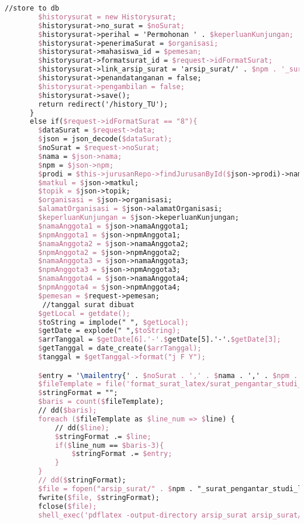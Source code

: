 \begin{lstlisting}[language=tex,basicstyle=\tiny,caption=HistorysuratController.php]
        //store to db
        $historysurat = new Historysurat;
        $historysurat->no_surat = $noSurat;
        $historysurat->perihal = 'Permohonan ' . $keperluanKunjungan;
        $historysurat->penerimaSurat = $organisasi;
        $historysurat->mahasiswa_id = $pemesan;
        $historysurat->formatsurat_id = $request->idFormatSurat;
        $historysurat->link_arsip_surat = 'arsip_surat/' . $npm . '_surat_pengantar_studi_lapangan_4orang.pdf';
        $historysurat->penandatanganan = false;
        $historysurat->pengambilan = false;
        $historysurat->save();
        return redirect('/history_TU');
      }
      else if($request->idFormatSurat == "8"){
        $dataSurat = $request->data;
        $json = json_decode($dataSurat);
        $noSurat = $request->noSurat;
        $nama = $json->nama;
        $npm = $json->npm;
        $prodi = $this->jurusanRepo->findJurusanById($json->prodi)->nama_jurusan;
        $matkul = $json->matkul;
        $topik = $json->topik;
        $organisasi = $json->organisasi;
        $alamatOrganisasi = $json->alamatOrganisasi;
        $keperluanKunjungan = $json->keperluanKunjungan;
        $namaAnggota1 = $json->namaAnggota1;
        $npmAnggota1 = $json->npmAnggota1;
        $namaAnggota2 = $json->namaAnggota2;
        $npmAnggota2 = $json->npmAnggota2;
        $namaAnggota3 = $json->namaAnggota3;
        $npmAnggota3 = $json->npmAnggota3;
        $namaAnggota4 = $json->namaAnggota4;
        $npmAnggota4 = $json->npmAnggota4;
        $pemesan = $request->pemesan;
         //tanggal surat dibuat
        $getLocal = getdate();
        $toString = implode(" ", $getLocal);
        $getDate = explode(" ",$toString);
        $arrTanggal = $getDate[6].'-'.$getDate[5].'-'.$getDate[3];
        $getTanggal = date_create($arrTanggal);
        $tanggal = $getTanggal->format("j F Y");

        $entry = '\mailentry{' . $noSurat . ',' . $nama . ',' . $npm . ',' . $prodi . ',' . $matkul . ',' . $topik . ',' . $organisasi . ',' . $alamatOrganisasi . ',' . $keperluanKunjungan . ',' . $namaAnggota1 . ',' . $npmAnggota1 . ',' . $namaAnggota2 . ',' . $npmAnggota2 . ',' . $namaAnggota3 . ',' . $npmAnggota3 . ',' . $namaAnggota4 . ',' . $npmAnggota4 . ',' . $tanggal . '}';
        $fileTemplate = file('format_surat_latex/surat_pengantar_studi_lapangan_5orang.tex');
        $stringFormat = "";
        $baris = count($fileTemplate);
        // dd($baris);
        foreach ($fileTemplate as $line_num => $line) {
            // dd($line);
            $stringFormat .= $line;
            if($line_num == $baris-3){
                $stringFormat .= $entry;
            }
        }
        // dd($stringFormat);
        $file = fopen("arsip_surat/" . $npm . "_surat_pengantar_studi_lapangan_5orang.tex", "w");
        fwrite($file, $stringFormat);
        fclose($file);
        shell_exec('pdflatex -output-directory arsip_surat arsip_surat/' . $npm . '_surat_pengantar_studi_lapangan_5orang.tex');


\end{lstlisting}
